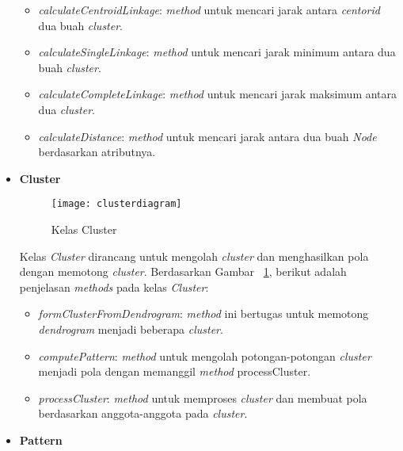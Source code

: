 \begin{itemize}
\begin{itemize}
\item \textit{calculateCentroidLinkage}: \textit{method} untuk mencari jarak antara \textit{centorid} dua buah \textit{cluster}.

\item \textit{calculateSingleLinkage}: \textit{method} untuk mencari jarak minimum antara dua buah \textit{cluster}.

\item \textit{calculateCompleteLinkage}: \textit{method} untuk mencari jarak maksimum antara dua \textit{cluster}.

\item \textit{calculateDistance}: \textit{method} untuk mencari jarak antara dua buah \textit{Node} berdasarkan atributnya.\\
 
\end{itemize}


\item \textbf{Cluster}\\

\begin{figure}[H]
    \centering  
    \texttt{[image: clusterdiagram]}  
    \caption[Kelas Cluster]{Kelas Cluster} 
    \label{fig:clusterdiagram} 
\end{figure}

Kelas \textit{Cluster} dirancang untuk mengolah \textit{cluster} dan menghasilkan pola dengan memotong \textit{cluster}. Berdasarkan Gambar ~\ref{fig:clusterdiagram}, berikut adalah penjelasan \textit{methods} pada kelas \textit{Cluster}:

\begin{itemize}

\item \textit{formClusterFromDendrogram}: \textit{method} ini bertugas untuk memotong \textit{dendrogram} menjadi beberapa \textit{cluster}.

\item \textit{computePattern}: \textit{method} untuk mengolah potongan-potongan \textit{cluster} menjadi pola dengan memanggil \textit{method} processCluster.

\item \textit{processCluster}: \textit{method} untuk memproses \textit{cluster} dan membuat pola berdasarkan anggota-anggota pada \textit{cluster}.\\
 
\end{itemize}


\item \textbf{Pattern}\\


\end{itemize}
